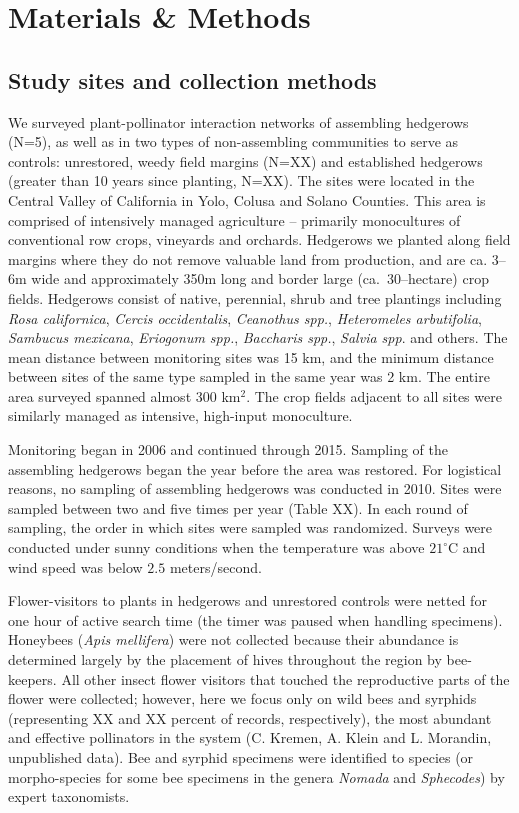 \documentclass[12pt]{article}
\begin{document}
\section*{Materials \& Methods}
\label{sec:methods}

\subsection*{Study sites and collection methods}
\label{sec:study-sites}

We surveyed plant-pollinator interaction networks of assembling
hedgerows (N=5), as well as in two types of non-assembling communities
to serve as controls: unrestored, weedy field margins (N=XX) and
established hedgerows (greater than 10 years since planting,
N=XX). The sites were located in the Central Valley of California in
Yolo, Colusa and Solano Counties. This area is comprised of
intensively managed agriculture -- primarily monocultures of
conventional row crops, vineyards and orchards. Hedgerows we planted
along field margins where they do not remove valuable land from
production, and are ca. 3--6m wide and approximately 350m long and
border large (ca.\ 30--hectare) crop fields. Hedgerows consist of
native, perennial, shrub and tree plantings including \textit{Rosa
  californica}, \textit{Cercis occidentalis}, \textit{Ceanothus spp.},
\textit{Heteromeles arbutifolia}, \textit{Sambucus mexicana},
\textit{Eriogonum spp.}, \textit{Baccharis spp.}, \textit{Salvia
  spp}. and others. The mean distance between monitoring sites was 15
km, and the minimum distance between sites of the same type sampled in
the same year was 2 km.  The entire area surveyed spanned almost 300
km$^2$. The crop fields adjacent to all sites were similarly managed
as intensive, high-input monoculture.

Monitoring began in 2006 and continued through 2015. Sampling of the
assembling hedgerows began the year before the area was restored. For
logistical reasons, no sampling of assembling hedgerows was conducted
in 2010. Sites were sampled between two and five times per year (Table
XX). In each round of sampling, the order in which sites were sampled
was randomized. Surveys were conducted under sunny conditions when the
temperature was above $21^{\circ}\mathrm{C}$ and wind speed was below
$2.5$ meters/second.

Flower-visitors to plants in hedgerows and unrestored controls were
netted for one hour of active search time (the timer was paused when
handling specimens). Honeybees (\textit{Apis mellifera}) were not
collected because their abundance is determined largely by the
placement of hives throughout the region by bee-keepers. All other
insect flower visitors that touched the reproductive parts of the
flower were collected; however, here we focus only on wild bees and
syrphids (representing XX and XX percent of records, respectively),
the most abundant and effective pollinators in the system (C. Kremen,
A. Klein and L. Morandin, unpublished data). Bee and syrphid specimens
were identified to species (or morpho-species for some bee specimens
in the genera \textit{Nomada} and \textit{Sphecodes}) by expert
taxonomists.
\end{document}
